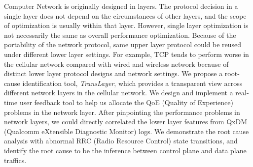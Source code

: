 
Computer Network is originally designed in layers. The protocol decision in a single layer does not depend on the circumstances of other layers, and the scope of optimization is usually within that layer. However, single layer optimization is not necessarily the same as overall performance optimization. Because of the portability of the network protocol, same upper layer protocol could be reused under different lower layer settings. For example, TCP tends to perform worse in the cellular network compared with wired and wireless network because of distinct lower layer protocol designs and network settings. We propose a root-cause identification tool, \textit{TransLayer}, which provides a transparent view across different network layers in the cellular network. We design and implement a real-time user feedback tool to help us allocate the QoE (Quality of Experience) problems in the network layer. After pinpointing the performance problems in network layers, we could directly correlated the lower layer features from QxDM (Qualcomm eXtensible Diagnostic Monitor) logs.  We demonstrate the root cause analysis with abnormal RRC (Radio Resource Control) state transitions, and identify the root cause to be the inference between control plane and data plane traffics.

\label{sec:abstract}

